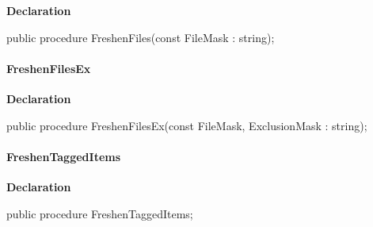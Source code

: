 \documentclass{report}
\newif\ifpdf
\begin{document}
\label{AbArcTyp.TAbArchive-FreshenFiles}
\begin{list}{}{
\setlength{\itemindent}{0cm}
\setlength{\listparindent}{0cm}
\setlength{\leftmargin}{\evensidemargin}
\addtolength{\leftmargin}{\tmplength}
\settowidth{\labelsep}{X}
\addtolength{\leftmargin}{\labelsep}
\setlength{\labelwidth}{\tmplength}
}
\item[\textbf{Declaration}\hfill]
\ifpdf
\begin{flushleft}
\fi
\begin{ttfamily}
public procedure FreshenFiles(const FileMask : string);\end{ttfamily}

\ifpdf
\end{flushleft}
\fi

\end{list}
\paragraph*{FreshenFilesEx}\hspace*{\fill}

\label{AbArcTyp.TAbArchive-FreshenFilesEx}
\begin{list}{}{
\setlength{\itemindent}{0cm}
\setlength{\listparindent}{0cm}
\setlength{\leftmargin}{\evensidemargin}
\addtolength{\leftmargin}{\tmplength}
\settowidth{\labelsep}{X}
\addtolength{\leftmargin}{\labelsep}
\setlength{\labelwidth}{\tmplength}
}
\item[\textbf{Declaration}\hfill]
\ifpdf
\begin{flushleft}
\fi
\begin{ttfamily}
public procedure FreshenFilesEx(const FileMask, ExclusionMask : string);\end{ttfamily}

\ifpdf
\end{flushleft}
\fi

\end{list}
\paragraph*{FreshenTaggedItems}\hspace*{\fill}

\label{AbArcTyp.TAbArchive-FreshenTaggedItems}
\begin{list}{}{
\setlength{\itemindent}{0cm}
\setlength{\listparindent}{0cm}
\setlength{\leftmargin}{\evensidemargin}
\addtolength{\leftmargin}{\tmplength}
\settowidth{\labelsep}{X}
\addtolength{\leftmargin}{\labelsep}
\setlength{\labelwidth}{\tmplength}
}
\item[\textbf{Declaration}\hfill]
\ifpdf
\begin{flushleft}
\fi
\begin{ttfamily}
public procedure FreshenTaggedItems;\end{ttfamily}

\ifpdf
\end{flushleft}
\fi

\end{list}
\end{document}
